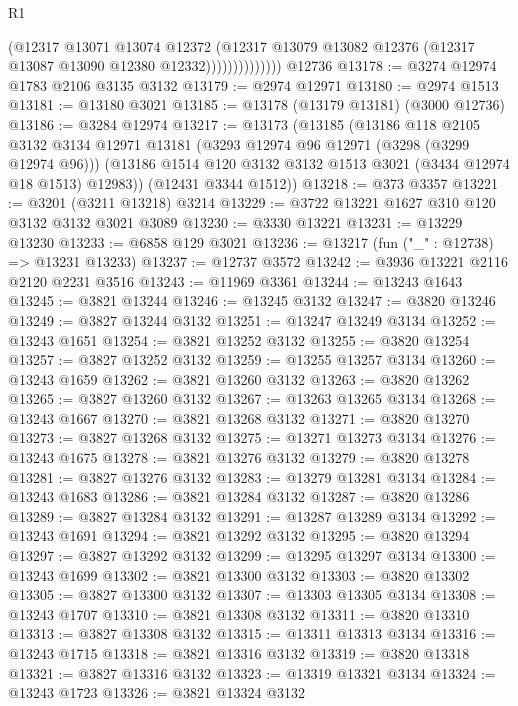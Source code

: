 \begin{lexlean}{R1}
\begin{coremodule}
                          (@12317
                            @13071
                            @13074
                            @12372
                            (@12317
                              @13079
                              @13082
                              @12376
                              (@12317 @13087 @13090 @12380 @12332))))))))))))))
    @12736
@13178 := @3274 @12974 @1783 @2106 @3135 @3132
@13179 := @2974 @12971
@13180 := @2974 @1513
@13181 := @13180 @3021
@13185 := @13178 (@13179 @13181) (@3000 @12736)
@13186 := @3284 @12974
@13217 := @13173
    (@13185
      (@13186
        @118
        @2105
        @3132
        @3134
        @12971
        @13181
        (@3293 @12974 @96 @12971 (@3298 (@3299 @12974 @96)))
        (@13186 @1514 @120 @3132 @3132 @1513 @3021 (@3434 @12974 @18 @1513) @12983))
      (@12431 @3344 @1512))
@13218 := @373 @3357
@13221 := @3201 (@3211 @13218) @3214
@13229 := @3722 @13221 @1627 @310 @120 @3132 @3132 @3021 @3089
@13230 := @3330 @13221
@13231 := @13229 @13230
@13233 := @6858 @129 @3021
@13236 := @13217 (fun ("_" : @12738) => @13231 @13233)
@13237 := @12737 @3572
@13242 := @3936 @13221 @2116 @2120 @2231 @3516
@13243 := @11969 @3361
@13244 := @13243 @1643
@13245 := @3821 @13244
@13246 := @13245 @3132
@13247 := @3820 @13246
@13249 := @3827 @13244 @3132
@13251 := @13247 @13249 @3134
@13252 := @13243 @1651
@13254 := @3821 @13252 @3132
@13255 := @3820 @13254
@13257 := @3827 @13252 @3132
@13259 := @13255 @13257 @3134
@13260 := @13243 @1659
@13262 := @3821 @13260 @3132
@13263 := @3820 @13262
@13265 := @3827 @13260 @3132
@13267 := @13263 @13265 @3134
@13268 := @13243 @1667
@13270 := @3821 @13268 @3132
@13271 := @3820 @13270
@13273 := @3827 @13268 @3132
@13275 := @13271 @13273 @3134
@13276 := @13243 @1675
@13278 := @3821 @13276 @3132
@13279 := @3820 @13278
@13281 := @3827 @13276 @3132
@13283 := @13279 @13281 @3134
@13284 := @13243 @1683
@13286 := @3821 @13284 @3132
@13287 := @3820 @13286
@13289 := @3827 @13284 @3132
@13291 := @13287 @13289 @3134
@13292 := @13243 @1691
@13294 := @3821 @13292 @3132
@13295 := @3820 @13294
@13297 := @3827 @13292 @3132
@13299 := @13295 @13297 @3134
@13300 := @13243 @1699
@13302 := @3821 @13300 @3132
@13303 := @3820 @13302
@13305 := @3827 @13300 @3132
@13307 := @13303 @13305 @3134
@13308 := @13243 @1707
@13310 := @3821 @13308 @3132
@13311 := @3820 @13310
@13313 := @3827 @13308 @3132
@13315 := @13311 @13313 @3134
@13316 := @13243 @1715
@13318 := @3821 @13316 @3132
@13319 := @3820 @13318
@13321 := @3827 @13316 @3132
@13323 := @13319 @13321 @3134
@13324 := @13243 @1723
@13326 := @3821 @13324 @3132

\end{coremodule}
\end{lexlean}
